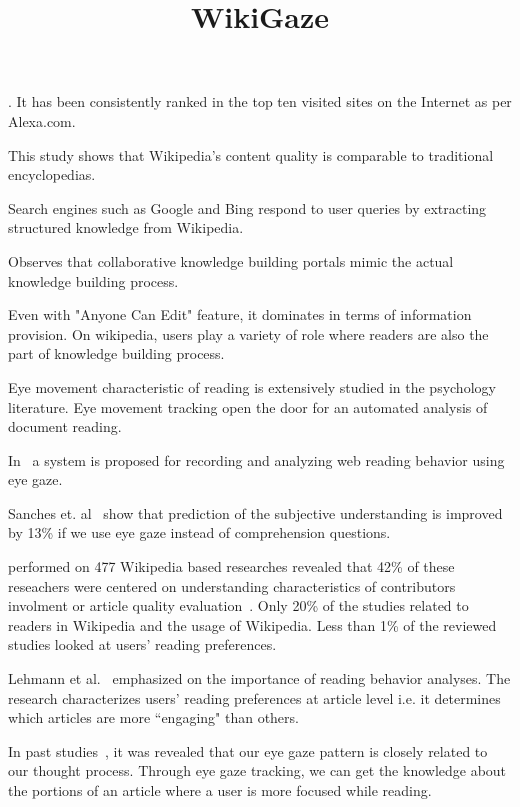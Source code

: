 \documentclass[12pt]{article}
\begin{document}
\title{WikiGaze}
\maketitle

\cite{wiki:Wikipedia:Statistics}. It has been consistently ranked in the top ten visited sites on the Internet as per Alexa.com. 

\cite{giles2005internet} This study shows that Wikipedia's content quality is comparable to traditional encyclopedias. 

\cite{bergstrom2009conversation} Search engines such as Google and Bing respond to user queries by extracting structured knowledge from Wikipedia.

\cite{cress2008systemic} Observes that collaborative knowledge building portals mimic the actual knowledge building process. 


\cite{antin2010readers} Even with "Anyone Can Edit" feature, it dominates in terms of information provision. On wikipedia, users play a variety of role where readers are also the part of knowledge building process.

\cite{rayner1998eye} Eye movement characteristic of reading is extensively studied in the psychology literature. Eye movement tracking open the door for an automated analysis of document reading. 

In~\cite{beymer2005webgazeanalyzer} a system is proposed for recording and analyzing web reading behavior using eye gaze.

Sanches et. al~\cite{sanches2018estimation} show that prediction of the subjective understanding is improved by 13\% if we use eye gaze instead of comprehension questions.

\cite{okoli2012people} performed on 477 Wikipedia based researches revealed that 42\% of these reseachers were centered on understanding characteristics of contributors involment or article quality evaluation~\cite{wilkinson2007assessing, kittur2008harnessing, stvilia2008information}. Only 20\% of the studies related to readers in Wikipedia and the usage of Wikipedia. Less than 1\% of the reviewed studies looked at users' reading preferences.


Lehmann et al.~\cite{lehmann2014reader} emphasized on the importance of reading behavior analyses. The research characterizes users' reading preferences at article level i.e. it determines which articles are more ``engaging" than others. 


In past studies~\cite{calder2002reading, bff9c00ddce3404ca729f4a96d53a701}, it was revealed that our eye gaze pattern is closely related to our thought process. Through eye gaze tracking, we can get the knowledge about the portions of an article where a user is more focused while reading. 
\end{document}
